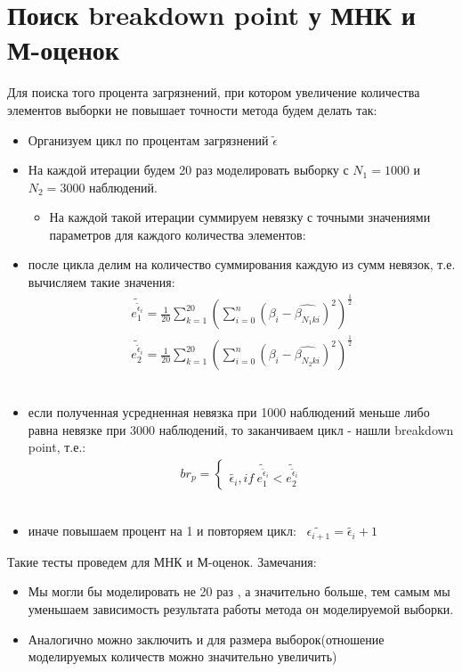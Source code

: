 \documentclass[12pt]{article}
\begin{document}
\section{Поиск breakdown point у МНК и М-оценок}
Для поиска того процента загрязнений, при котором увеличение количества элементов выборки не повышает точности метода будем делать так:\hfill\break
\begin{itemize}
    \item Организуем цикл по процентам загрязнений $\widetilde{\epsilon}$\\
    \item На каждой итерации будем 20 раз моделировать выборку с $N_1=1000$ и $N_2=3000$ наблюдений.
        \begin{itemize}
            \item На каждой такой итерации суммируем невязку с точными значениями параметров для каждого количества элементов:
        \end{itemize}
    \item после цикла делим на количество суммирования каждую из сумм невязок, т.е. вычисляем такие значения:
            \begin{eqnarray}
                \widetilde{e_1^{\widetilde{\epsilon}_i}}= \frac{1}{20}\sum_{k=1}^{20}(\sum_{i=0}^{n}(\beta_i-\hat{\beta_{N_1ki}})^2)^{\frac{1}{2}}\\
                \widetilde{e_2^{\widetilde{\epsilon}_i}}= \frac{1}{20}\sum_{k=1}^{20}(\sum_{i=0}^{n}(\beta_i-\hat{\beta_{N_2ki}})^2)^{\frac{1}{2}}
            \end{eqnarray}\\
    \item если полученная усредненная невязка при 1000 наблюдений меньше либо равна невязке при 3000 наблюдений, то заканчиваем цикл - нашли breakdown point, т.е.:
            \begin{eqnarray}
                br_p=
                \begin{cases}
                    \widetilde{\epsilon_i}, if~ \widetilde{e_1^{\widetilde{\epsilon}_i}}<\widetilde{e_2^{\widetilde{\epsilon}_i}}
                \end{cases}
            \end{eqnarray}\\
    \item иначе повышаем процент на 1 и повторяем цикл: ~$\widetilde{\epsilon_{i+1}}=\widetilde{\epsilon_{i}}+1$
\end{itemize}
Такие тесты проведем для МНК и М-оценок.\hfill\break
Замечания:\hfill\break
\begin{itemize}
    \item Мы могли бы моделировать не 20 раз , а значительно больше, тем самым мы уменьшаем зависимость результата работы метода он моделируемой выборки.\\
    \item Аналогично можно заключить и для размера выборок(отношение моделируемых количеств можно значительно увеличить)
\end{itemize}
\end{document}
